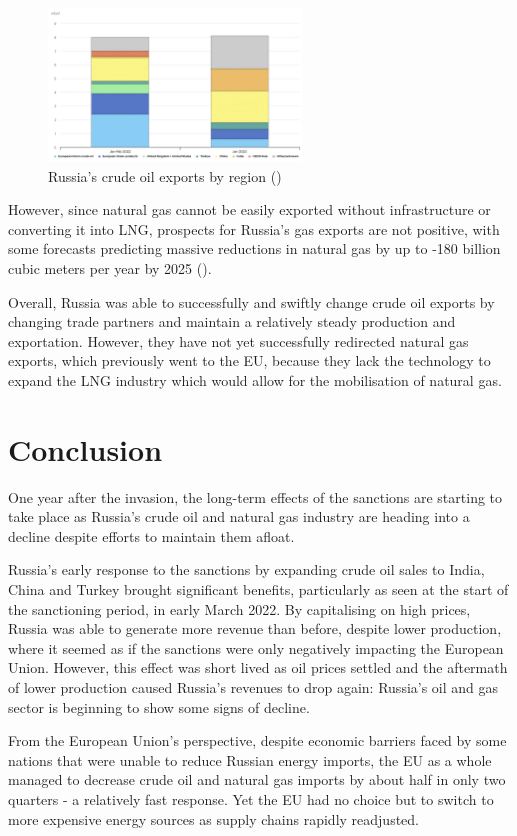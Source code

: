 \documentclass[12pt]{article}
\begin{document}
\begin{figure}[h]
    \centering
    \includegraphics[width=0.6\textwidth]{images/trade change.jpg}
    \caption{Russia's crude oil exports by region (\citeauthor{iea})}
    \label{fig:trade change}
\end{figure}

However, since natural gas cannot be easily exported without infrastructure or converting it into LNG, prospects for Russia's gas exports are not positive, with some forecasts predicting massive reductions in natural gas by up to -180 billion cubic meters per year by 2025 (\citeauthor{iea_2022_journal}). 

Overall, Russia was able to successfully and swiftly change crude oil exports by changing trade partners and maintain a relatively steady production and exportation. However, they have not yet successfully redirected natural gas exports, which previously went to the EU, because they lack the technology to expand the LNG industry which would allow for the mobilisation of natural gas. 

\section{Conclusion}

One year after the invasion, the long-term effects of the sanctions are starting to take place as Russia's crude oil and natural gas industry are heading into a decline despite efforts to maintain them afloat. 

Russia's early response to the sanctions by expanding crude oil sales to India, China and Turkey brought significant benefits, particularly as seen at the start of the sanctioning period, in early March 2022. By capitalising on high prices, Russia was able to generate more revenue than before, despite lower production, where it seemed as if the sanctions were only negatively impacting the European Union. However, this effect was short lived as oil prices settled and the aftermath of lower production caused Russia's revenues to drop again: Russia's oil and gas sector is beginning to show some signs of decline. 

From the European Union's perspective, despite economic barriers faced by some nations that were unable to reduce Russian energy imports, the EU as a whole managed to decrease crude oil and natural gas imports by about half in only two quarters - a relatively fast response. Yet the EU had no choice but to switch to more expensive energy sources as supply chains rapidly readjusted.  

\pagebreak

\printbibliography
 
\end{document}
